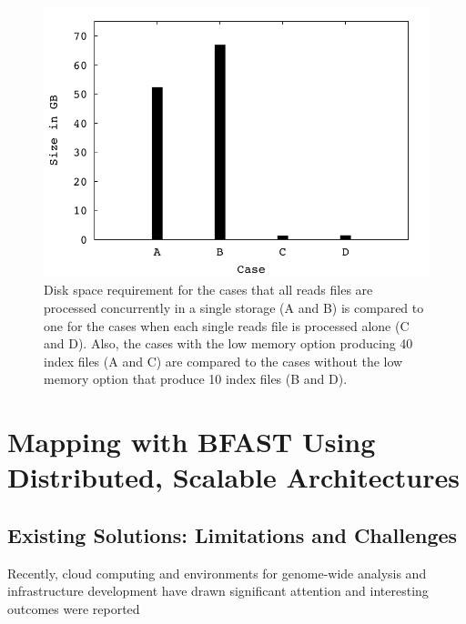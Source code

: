 \documentclass{acm_proc_article-sp}
\begin{document}
\begin{figure}
 \centering
\includegraphics[scale=0.66]{figures/diskspace.pdf}
\caption{\small Disk space requirement for the cases that all reads
  files are processed concurrently in a single storage (A and B) is compared to
  one for the cases when each single reads file is processed alone (C and D).  Also, the cases with the low memory option producing 40 index files (A and C) are compared to the cases without the low memory option that produce 10 index files (B and D).  }
  \label{fig:diskspace} 
 \end{figure}

\section{Mapping with BFAST Using \\ Distributed, Scalable Architectures}

\subsection{Existing Solutions: Limitations and Challenges}


Recently, cloud computing and environments for genome-wide analysis and infrastructure development have drawn significant attention and interesting outcomes were reported\cite{taylor2010,cloudburst, cloudblast, langmead2009, langmead2010,gatk, halligan2009}
\end{document}
